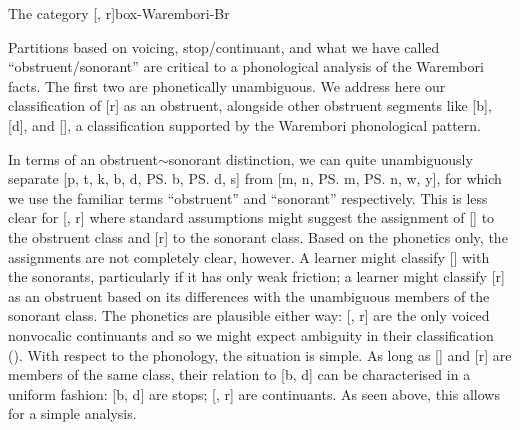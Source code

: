 \begin{dadpbox}{The category {[\B, r]}}{box-Warembori-Br}


Partitions based on voicing, stop/continuant, and  what we have called ``obstruent/sonorant'' are critical to a phonological analysis of the Warembori facts. The first two are phonetically unambiguous. We address here our classification of  [r] as an obstruent, alongside other obstruent segments like [b], [d], and [\B], a classification supported by the Warembori phonological pattern.\\ 

In terms of an obstruent$\sim$sonorant distinction, we can quite unambiguously separate [p, t, k, b, d, \ps b, \ps d, s] from [m, n, \ps m, \ps n, w, y], for which we use the familiar terms ``obstruent'' and ``sonorant'' respectively. This is less clear for [, r] where standard assumptions might suggest the assignment of [] to the obstruent class and  [r] to the sonorant class. Based on the phonetics only, the assignments are not completely clear, however. A learner might classify [] with the sonorants, particularly if it has only weak friction; a learner  might classify [r] as an obstruent based on its differences with the unambiguous members of the sonorant class. The phonetics are plausible either way: [, r] are the only voiced nonvocalic continuants and so we might expect ambiguity in their classification (\citealt{Mielke:2008}). With respect to the phonology, the situation is simple. As long as [] and [r] are members of the same class, their relation to [b, d] can be characterised in a uniform fashion: [b, d] are stops; [, r] are continuants. As seen above, this allows for a simple analysis.\\


\end{dadpbox}
